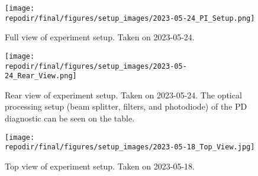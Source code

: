 \begin{figure}[]
\centering
\texttt{[image: \\repodir/final/figures/setup\_images/2023-05-24\_PI\_Setup.png]}
\caption{Full view of experiment setup. Taken on 2023-05-24.}
\label{fig:SI_Full_Setup_PI}
\end{figure}


\begin{figure}[]
\centering
\texttt{[image: \\repodir/final/figures/setup\_images/2023-05-24\_Rear\_View.png]}
\caption{Rear view of experiment setup. Taken on 2023-05-24. The optical processing setup (beam splitter, filters, and photodiode) of the PD diagnostic can be seen on the table. }
\label{fig:SI_Rear_View}
\end{figure}

\begin{figure}[]
\centering
\texttt{[image: \\repodir/final/figures/setup\_images/2023-05-18\_Top\_View.jpg]}
\caption{Top view of experiment setup. Taken on 2023-05-18.}
\label{fig:SI_Top_View}
\end{figure}


